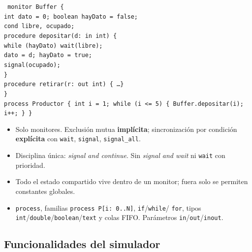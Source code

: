 \documentclass[11pt,a4paper]{article}
\begin{document}
\begin{tcolorbox}[colback=boxgray, colframe=boxline, boxrule=0.5pt, arc=2pt, left=8pt, right=8pt, top=6pt, bottom=6pt]
\texttt{\footnotesize
monitor Buffer \{\\
\phantom{xx}int dato = 0;\ boolean hayDato = false;\\
\phantom{xx}cond libre, ocupado;\\[2pt]
\phantom{xx}procedure depositar(d: in int) \{\\
\phantom{xxxx}while (hayDato) wait(libre);\\
\phantom{xxxx}dato = d;\ hayDato = true;\\
\phantom{xxxx}signal(ocupado);\\
\phantom{xx}\}\\
\phantom{xx}procedure retirar(r: out int) \{ \ldots \}\\
\}\\[2pt]
process Productor \{ int i = 1; while (i <= 5) \{ Buffer.depositar(i); i++; \} \}
}
\end{tcolorbox}

\begin{itemize}[leftmargin=1.4em]
  \item Solo monitores. Exclusión mutua \textbf{implícita}; sincronización por condición
        \textbf{explícita} con \texttt{wait}, \texttt{signal}, \texttt{signal\_all}.
  \item Disciplina única: \emph{signal and continue}. Sin \emph{signal and wait} ni
        \texttt{wait} con prioridad.
  \item Todo el estado compartido vive dentro de un monitor; fuera solo se permiten
        constantes globales.
  \item \texttt{process}, familias \texttt{process P[i: 0..N]}, \texttt{if}/\texttt{while}/
        \texttt{for}, tipos \texttt{int}/\texttt{double}/\texttt{boolean}/\texttt{text} y
        colas FIFO. Parámetros \texttt{in}/\texttt{out}/\texttt{inout}.
\end{itemize}

\subsection{Funcionalidades del simulador}
\end{document}
